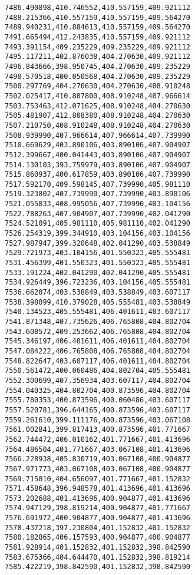 \documentclass[11pt]{article}
\begin{document}
\begin{Verbatim}[commandchars=\\\{\}]
7486.490898,410.746552,410.557159,409.921112
7488.215366,410.557159,410.557159,409.564270
7489.940231,410.884613,410.557159,409.564270
7491.665494,412.243835,410.557159,409.921112
7493.391154,409.235229,409.235229,409.921112
7495.117211,402.876038,404.270630,409.921112
7496.843666,398.950745,404.270630,409.235229
7498.570518,400.050568,404.270630,409.235229
7500.297769,404.270630,404.270630,408.910248
7502.025417,410.807800,408.910248,407.966614
7503.753463,412.071625,408.910248,404.270630
7505.481907,412.808380,408.910248,404.270630
7507.210750,408.910248,408.910248,404.270630
7508.939990,407.966614,407.966614,407.739990
7510.669629,403.890106,403.890106,407.904907
7512.399667,400.041443,403.890106,407.904907
7514.130103,393.759979,403.890106,407.904907
7515.860937,400.617859,403.890106,407.739990
7517.592170,409.598145,407.739990,405.981110
7519.323802,407.739990,407.739990,403.890106
7521.055833,408.995056,407.739990,403.104156
7522.788263,407.904907,407.739990,402.041290
7524.521091,405.981110,405.981110,402.041290
7526.254319,399.344910,403.104156,403.104156
7527.987947,399.320648,402.041290,403.538849
7529.721973,403.104156,401.550323,405.555481
7531.456399,401.550323,401.550323,405.555481
7533.191224,402.041290,402.041290,405.555481
7534.926449,396.723236,403.104156,405.555481
7536.662074,403.538849,403.538849,403.607117
7538.398099,410.379028,405.555481,403.538849
7540.134523,405.555481,406.401611,403.607117
7541.871348,407.735626,406.765808,404.802704
7543.608572,409.253662,406.765808,404.802704
7545.346197,406.401611,406.401611,404.802704
7547.084222,406.765808,406.765808,404.802704
7548.822647,403.607117,406.401611,404.802704
7550.561472,400.060486,404.802704,405.555481
7552.300699,407.356934,403.607117,404.802704
7554.040325,404.802704,400.873596,404.802704
7555.780353,400.873596,400.060486,403.607117
7557.520781,396.644165,400.873596,403.607117
7559.261610,399.111176,400.873596,403.067108
7561.002841,399.817413,400.873596,401.771667
7562.744472,406.010162,401.771667,401.413696
7564.486504,401.771667,403.067108,401.413696
7566.228938,405.830719,403.067108,400.904877
7567.971773,403.067108,403.067108,400.904877
7569.715010,404.656097,401.771667,401.152832
7571.458648,396.948578,401.413696,401.413696
7573.202688,401.413696,400.904877,401.413696
7574.947129,398.819214,400.904877,401.771667
7576.691972,400.904877,400.904877,401.413696
7578.437218,397.230804,401.152832,401.152832
7580.182865,406.157593,400.904877,400.904877
7581.928914,401.152832,401.152832,398.842590
7583.675366,404.644470,401.152832,398.819214
7585.422219,398.842590,401.152832,398.842590

\end{Verbatim}
\end{document}
